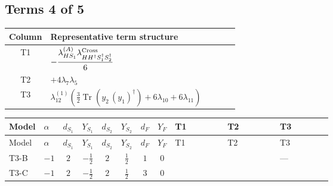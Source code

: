 \documentclass[8pt]{article}
\begin{document}
\begin{landscape}
\subsection*{Terms 4 of 5}
\begin{center}
\begin{tabular}{@{}c >{\raggedright\arraybackslash}p{0.82\linewidth}@{}}
\toprule
Column & Representative term structure \\
\midrule
T1 & \(\displaystyle -\frac{{\lambda_{HS_1}^{(A)}} {\lambda_{H H^\dagger S_1^\dagger S_2^\dagger}^{\rm Cross}}}{6}\) \\
\midrule
T2 & \(\displaystyle +4 {\lambda_7} {\lambda_5}\) \\
\midrule
T3 & \(\displaystyle {\lambda_{12}^{(1)}} \left(\frac{3}{2} \operatorname{Tr}\!\left({y_2}\,\left({y_1}\right)^{\dagger}\right)+6 {\lambda_{10}}+6 {\lambda_{11}}\right)\) \\
\midrule
\bottomrule
\end{tabular}
\end{center}
\smallskip
\tiny
\begin{longtable}{@{}llcccccc >{\raggedright\arraybackslash}p{0.21\linewidth} >{\raggedright\arraybackslash}p{0.21\linewidth} >{\raggedright\arraybackslash}p{0.21\linewidth}@{}}
\toprule
Model & $\alpha$ & $d_{S_1}$ & $Y_{S_1}$ & $d_{S_2}$ & $Y_{S_2}$ & $d_F$ & $Y_F$ & T1 & T2 & T3 \\
\midrule
\endfirsthead
\toprule
Model & $\alpha$ & $d_{S_1}$ & $Y_{S_1}$ & $d_{S_2}$ & $Y_{S_2}$ & $d_F$ & $Y_F$ & T1 & T2 & T3 \\
\midrule
\endhead
T3-B & $-1$ & $2$ & $-\frac{1}{2}$ & $2$ & $\frac{1}{2}$ & $1$ & $0$ & \scriptsize\adjustbox{max width=\linewidth}{$\begin{gathered} -\frac{{\lambda_{HS_1}^{(A)}} {\lambda_{H H^\dagger S_1^\dagger S_2^\dagger}^{\rm Cross}}}{6}\end{gathered}$} & \scriptsize\adjustbox{max width=\linewidth}{$\begin{gathered} +4 {\lambda_7} {\lambda_5}\end{gathered}$} & --- \\
\midrule
T3-C & $-1$ & $2$ & $-\frac{1}{2}$ & $2$ & $\frac{1}{2}$ & $3$ & $0$ & \scriptsize\adjustbox{max width=\linewidth}{$\begin{gathered} -\frac{{\lambda_{HS_1}^{(A)}} {\lambda_{H H^\dagger S_1^\dagger S_2^\dagger}^{\rm Cross}}}{6}\end{gathered}$} & \scriptsize\adjustbox{max width=\linewidth}{$\begin{gathered} +4 {\lambda_7} {\lambda_5}\end{gathered}$} & \scriptsize\adjustbox{max width=\linewidth}{$\begin{gathered} {\lambda_{12}^{(1)}} \left(\frac{3}{2} \operatorname{Tr}\!\left({y_2}\,\left({y_1}\right)^{\dagger}\right)+6 {\lambda_{10}}+6 {\lambda_{11}}\right)\end{gathered}$} \\

\end{longtable}
\end{landscape}
\end{document}
